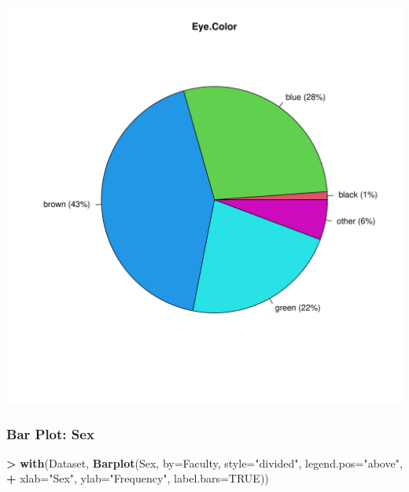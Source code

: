 \documentclass[
]{article}
\newenvironment{Shaded}{\begin{snugshade}}{\end{snugshade}}
\newcommand{\AttributeTok}[1]{\textcolor[rgb]{0.13,0.29,0.53}{#1}}
\newcommand{\ConstantTok}[1]{\textcolor[rgb]{0.56,0.35,0.01}{#1}}
\newcommand{\FunctionTok}[1]{\textcolor[rgb]{0.13,0.29,0.53}{\textbf{#1}}}
\newcommand{\NormalTok}[1]{#1}
\newcommand{\SpecialCharTok}[1]{\textcolor[rgb]{0.81,0.36,0.00}{\textbf{#1}}}
\newcommand{\StringTok}[1]{\textcolor[rgb]{0.31,0.60,0.02}{#1}}
\begin{document}
\includegraphics[width=750px]{RcmdrMarkdown_files/figure-latex/unnamed-chunk-22-1}

\subsubsection{Bar Plot: Sex}\label{bar-plot-sex}

\begin{Shaded}
\begin{Highlighting}[]
\SpecialCharTok{\textgreater{}} \FunctionTok{with}\NormalTok{(Dataset, }\FunctionTok{Barplot}\NormalTok{(Sex, }\AttributeTok{by=}\NormalTok{Faculty, }\AttributeTok{style=}\StringTok{"divided"}\NormalTok{, }\AttributeTok{legend.pos=}\StringTok{"above"}\NormalTok{, }
\SpecialCharTok{+}   \AttributeTok{xlab=}\StringTok{"Sex"}\NormalTok{, }\AttributeTok{ylab=}\StringTok{"Frequency"}\NormalTok{, }\AttributeTok{label.bars=}\ConstantTok{TRUE}\NormalTok{))}
\end{Highlighting}
\end{Shaded}
\end{document}
